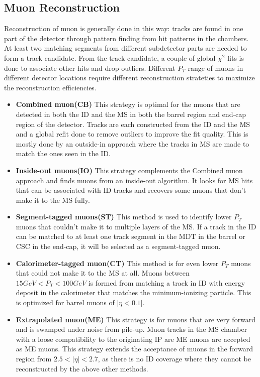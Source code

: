 \subsection{Muon Reconstruction}
Reconstruction of muon is generally done in this way: tracks are found in one part of the detector through pattern finding from hit patterns in the chambers. At least two matching segments from different subdetector parts are needed to form a track candidate. From the track candidate, a couple of global $\chi^{2}$ fits is done to associate other hits and drop outliers. Different $P_{T}$ range of muons in different detector locations require different reconstruction strateties to maximize the reconstruction efficiencies. 

\begin{itemize}
\item \textbf{Combined muon(CB)}
This strategy is optimal for the muons that are detected in both the ID and the MS in both the barrel region and end-cap region of the detector. Tracks are each constructed from the ID and the MS and a global refit done to remove outliers to improve the fit quality. This is mostly done by an outside-in approach where the tracks in MS are made to match the ones seen in the ID. 

\item \textbf{Inside-out muons(IO)}
This strategy complements the Combined muon approach and finds muons from an inside-out algorithm. It looks for MS hits that can be associated with ID tracks and recovers some muons that don't make it to the MS fully. 

\item \textbf{Segment-tagged muons(ST)}
This method is used to identify lower $P_{T}$ muons that couldn't make it to multiple layers of the MS. If a track in the ID can be matched to at least one track segment in the MDT in the barrel or CSC in the end-cap, it will be selected as a segment-tagged muon. 

\item \textbf{Calorimeter-tagged muon(CT)}
This method is for even lower $P_{T}$ muons that could not make it to the MS at all. Muons between $15 GeV < P_{T} < 100GeV$ is formed from matching a track in ID with energy deposit in the calorimeter that matches the minimum-ionizing particle. This is optimized for barrel muons of $|\eta <0.1|$. 

\item \textbf{Extrapolated muon(ME)}
This strategy is for muons that are very forward and is swamped under noise from pile-up. Muon tracks in the MS chamber with a loose compatibility to the originating IP are ME muons are accepted as ME muons. This strategy extends the acceptance of muons in the forward region from $2.5<|\eta|<2.7$, as there is no ID coverage where they cannot be reconstructed by the above other methods.

\end{itemize}

